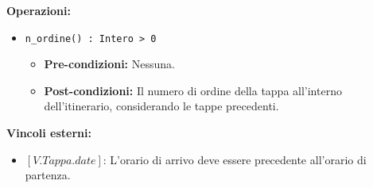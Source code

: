 \documentclass[a4paper]{scrartcl}
\begin{document}
\textbf{Operazioni:}
\begin{itemize}
    \item \texttt{n\_ordine() : Intero > 0}
        \begin{itemize}
            \item \textbf{Pre-condizioni:} Nessuna.
            \item \textbf{Post-condizioni:} Il numero di ordine della tappa all'interno dell'itinerario, considerando le tappe precedenti.
        \end{itemize}
\end{itemize}

\textbf{Vincoli esterni:}
\begin{itemize}
    \item $[V.Tappa.date]$: L'orario di arrivo deve essere precedente all'orario di partenza.
\end{itemize}
\end{document}
